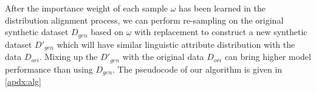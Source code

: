 After the importance weight of each sample $\omega$ has been learned in the distribution alignment process, we can perform re-sampling on the original synthetic dataset $D_{gen}$ based on $\omega$ with replacement to construct a new synthetic dataset $D'_{gen}$ which will have similar linguistic attribute distribution with the data $D_{ori}$. Mixing up the $D'_{gen}$ with the original data $D_{ori}$ can bring higher model performance than using $D_{gen}$. The pseudocode of our algorithm is given in \ref{apdx:alg}



